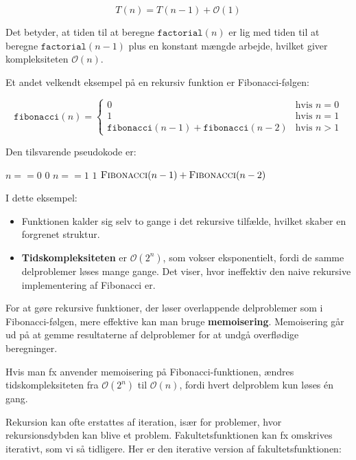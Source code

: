 \[
T(n) = T(n-1) + \mathcal{O}(1)
\]

Det betyder, at tiden til at beregne $\texttt{factorial}(n)$ er lig med tiden til at beregne $\texttt{factorial}(n-1)$ plus en konstant mængde arbejde, hvilket giver kompleksiteten $\mathcal{O}(n)$.

Et andet velkendt eksempel på en rekursiv funktion er Fibonacci-følgen:

\[
\texttt{fibonacci}(n) = 
\begin{cases}
0 & \text{hvis } n = 0 \\
1 & \text{hvis } n = 1 \\
\texttt{fibonacci}(n-1) + \texttt{fibonacci}(n-2) & \text{hvis } n > 1
\end{cases}
\]

Den tilsvarende pseudokode er:

\begin{codebox}
    \li \If $n == 0$ \Then
    \li     \Return $0$
        \End
    \li \If $n == 1$ \Then
    \li     \Return $1$
        \End
    \li \Return $\proc{Fibonacci}(n-1) + \proc{Fibonacci}(n-2)$
\end{codebox}

I dette eksempel:
\begin{itemize}
    \item Funktionen kalder sig selv to gange i det rekursive tilfælde, hvilket skaber en forgrenet struktur.
    \item \textbf{Tidskompleksiteten} er $\mathcal{O}(2^n)$, som vokser eksponentielt, fordi de samme delproblemer løses mange gange. Det viser, hvor ineffektiv den naive rekursive implementering af Fibonacci er.
\end{itemize}

For at gøre rekursive funktioner, der løser overlappende delproblemer som i Fibonacci-følgen, mere effektive kan man bruge \textbf{memoisering}. Memoisering går ud på at gemme resultaterne af delproblemer for at undgå overflødige beregninger.

Hvis man fx anvender memoisering på Fibonacci-funktionen, ændres tidskompleksiteten fra $\mathcal{O}(2^n)$ til $\mathcal{O}(n)$, fordi hvert delproblem kun løses én gang.

Rekursion kan ofte erstattes af iteration, især for problemer, hvor rekursionsdybden kan blive et problem. Fakultetsfunktionen kan fx omskrives iterativt, som vi så tidligere. Her er den iterative version af fakultetsfunktionen:

